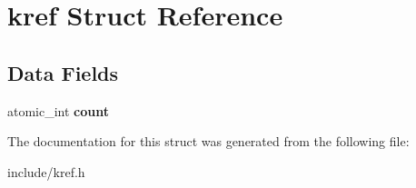 \hypertarget{structkref}{}\section{kref Struct Reference}
\label{structkref}
\subsection*{Data Fields}
\begin{DoxyCompactItemize}
\item 
\mbox{\label{structkref_a2502b7dbe80b5a4e56579f3a801a5c2e}} 
atomic\+\_\+int {\bfseries count}
\end{DoxyCompactItemize}


The documentation for this struct was generated from the following file\+:\begin{DoxyCompactItemize}
\item 
include/kref.\+h\end{DoxyCompactItemize}

